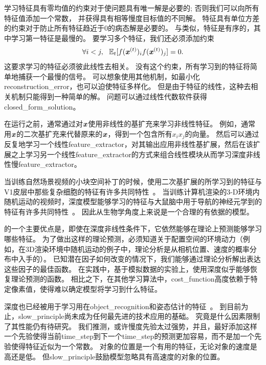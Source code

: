 
学习特征具有零均值的约束对于使问题具有唯一解是必要的; 
否则我们可以向所有特征值添加一个常数，
并获得具有相等慢度目标值的不同解。
特征具有单位方差的约束对于防止所有特征趋近于$0$的病态解是必要的。
与类似，特征是有序的，其中学习第一特征是最慢的。
要学习多个特征，我们还必须添加约束
\begin{align}
\label{eqn:1311}
\forall i<j,\ \  \mathbb{E}_t [f(\boldsymbol{\mathit{x}}^{(t)})_i  f(\boldsymbol{\mathit{x}}^{(t)})_j] = 0.
\end{align}
这要求学习的特征必须彼此线性去相关。 
没有这个约束，所有学习到的特征将简单地捕获一个最慢的信号。
可以想象使用其他机制，如最小化\gls{reconstruction_error}，也可以迫使特征多样化。
但是由于特征的线性，这种去相关机制只能得到一种简单的解。 
问题可以通过线性代数软件获得\gls{closed_form_solution}。



在运行之前，通常通过对$\boldsymbol{\mathit{x}}$使用非线性的基扩充来学习非线性特征。
例如，通常用$\boldsymbol{\mathit{x}}$的二次基扩充来代替原来的$\boldsymbol{\mathit{x}}$，得到一个包含所有$x_ix_j$的向量。
然后可以通过反复地学习一个线性\gls{feature_extractor}，对其输出应用非线性基扩展，然后在该扩展之上学习另一个线性\gls{feature_extractor}的方式来组合线性模块从而学习深度非线性慢\gls{feature_extractor}。



当训练自然场景视频的小块空间补丁的时候，使用二次基扩展的所学习到的特征与V1皮层中那些复杂细胞的特征有许多共同特性~\citep{Berkes-Wiskott-2005}。
当训练计算机渲染的3-D环境内随机运动的视频时，深度模型能够学习的特征与大鼠脑中用于导航的神经元学到的特征有许多共同特性~\citep{franzius2007slowness}。
因此从生物学角度上来说是一个合理的有依据的模型。



的一个主要优点是，即使在深度非线性条件下，它依然能够在理论上预测能够学习哪些特征。
为了做出这样的理论预测，必须知道关于配置空间的环境动力（例如，在3D渲染环境中随机运动的例子中，理论分析是从相机位置、速度的概率分布中入手的）。
已知潜在因子如何改变的情况下，我们能够通过理论分析解出表达这些因子的最佳函数。
在实践中，基于模拟数据的实验上，使用深度似乎能够恢复理论预测的函数。
相比之下，在其他学习算法中，\gls{cost_function}高度依赖于特定像素值，使得难以确定模型将学习到什么特征。


深度也已经被用于学习用在\gls{object_recognition}和姿态估计的特征~\citep{Franzius2008}。
到目前为止，\gls{slow_principle}尚未成为任何最先进的技术应用的基础。
究竟是什么因素限制了其性能仍有待研究。
我们推测，或许慢度先验太过强势，并且，最好添加这样一个先验使得当前\gls{time_step}到下一个\gls{time_step}的预测更加容易，而不是加一个先验使得特征近似为一个常数。
对象的位置是一个有用的特征，无论对象的速度是高还是低。 
但\gls{slow_principle}鼓励模型忽略具有高速度的对象的位置。



